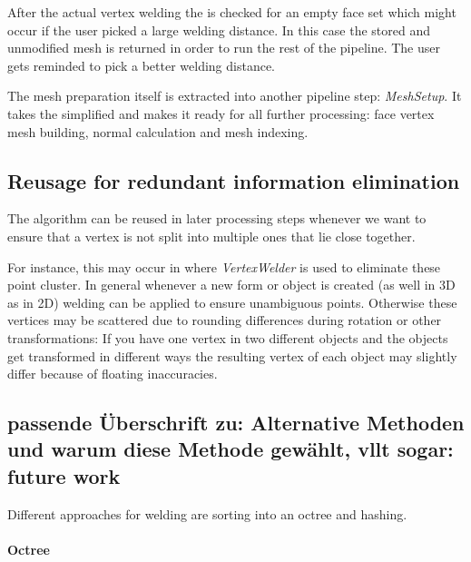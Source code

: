 \documentclass[../ClassicThesis.tex]{subfiles}
\begin{document}
After the actual vertex welding the {\threedmodel} is checked for an empty face set which might occur if the user picked a large welding distance. In this case the stored and unmodified mesh is returned in order to run the rest of the pipeline. The user gets reminded to pick a better welding distance.

The mesh preparation itself is extracted into another pipeline step: \emph{MeshSetup}. It takes the simplified {\threedmodel} and makes it ready for all further processing: face vertex mesh building, normal calculation and mesh indexing.


    
\subsection{Reusage for redundant information elimination}

The algorithm can be reused in later processing steps whenever we want to ensure that a vertex is not split into multiple ones that lie close together. 

For instance, this may occur in  where \emph{VertexWelder} is used to eliminate these point cluster. In general whenever a new form or object is created (as well in 3D as in 2D) welding can be applied to ensure unambiguous points. Otherwise these vertices may be scattered due to rounding differences during rotation or other transformations: If you have one vertex in two different objects and the objects get transformed in different ways the resulting vertex of each object may slightly differ because of floating inaccuracies.




\subsection{passende Überschrift zu: Alternative Methoden und warum diese Methode gewählt, vllt sogar: future work}


Different approaches for welding are sorting into an octree and hashing. 

\paragraph{Octree}
\end{document}
